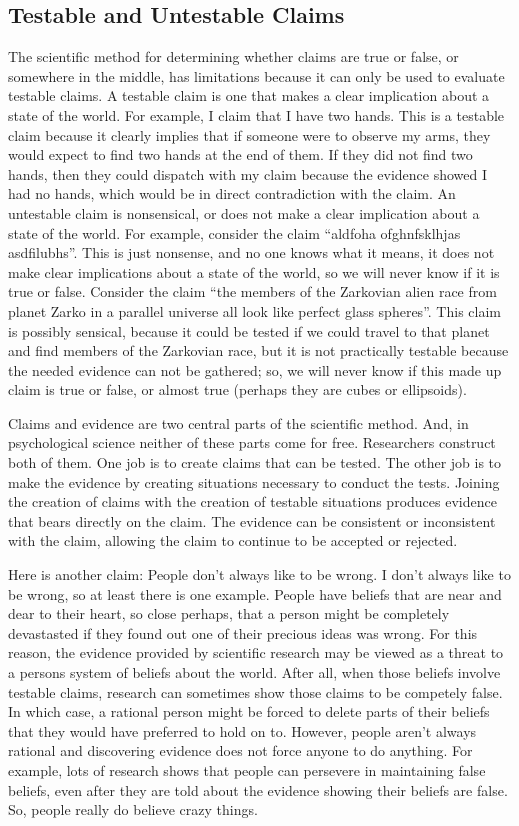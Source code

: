 \subsection{Testable and Untestable Claims}
The scientific method for determining whether claims are true or false, or somewhere in the middle, has limitations because it can only be used to evaluate testable claims. A testable claim is one that makes a clear implication about a state of the world. For example, I claim that I have two hands. This is a testable claim because it clearly implies that if someone were to observe my arms, they would expect to find two hands at the end of them. If they did not find two hands, then they could dispatch with my claim because the evidence showed I had no hands, which would be in direct contradiction with the claim. An untestable claim is nonsensical, or does not make a clear implication about a state of the world. For example, consider the claim “aldfoha ofghnfsklhjas asdfilubhs”. This is just nonsense, and no one knows what it means, it does not make clear implications about a state of the world, so we will never know if it is true or false. Consider the claim “the members of the Zarkovian alien race from planet Zarko in a parallel universe all look like perfect glass spheres”. This claim is possibly sensical, because it could be tested if we could travel to that planet and find members of the Zarkovian race, but it is not practically testable because the needed evidence can not be gathered; so, we will never know if this made up claim is true or false, or almost true (perhaps they are cubes or ellipsoids).

Claims and evidence are two central parts of the scientific method. And, in psychological science neither of these parts come for free. Researchers construct both of them. One job is to create claims that can be tested. The other job is to make the evidence by creating situations necessary to conduct the tests. Joining the creation of claims with the creation of testable situations produces evidence that bears directly on the claim. The evidence can be consistent or inconsistent with the claim, allowing the claim to continue to be accepted or rejected. 

Here is another claim: People don't always like to be wrong. I don't always like to be wrong, so at least there is one example. People have beliefs that are near and dear to their heart, so close perhaps, that a person might be completely devastasted if they found out one of their precious ideas was wrong. For this reason, the evidence provided by scientific research may be viewed as a threat to a persons system of beliefs about the world. After all, when those beliefs involve testable claims, research can sometimes show those claims to be competely false. In which case, a rational person might be forced to delete parts of their beliefs that they would have preferred to hold on to. However, people aren't always rational and discovering evidence does not force anyone to do anything. For example, lots of research shows that people can persevere in maintaining false beliefs, even after they are told about the evidence showing their beliefs are false. So, people really do believe crazy things.

